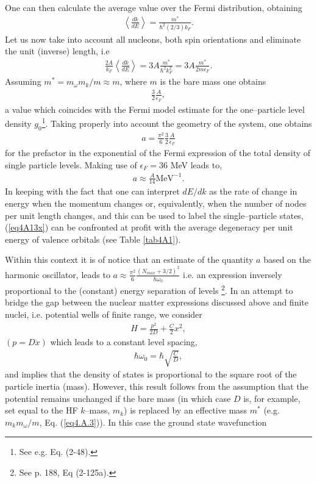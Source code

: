 \begin{subappendices}
One can then calculate the average value over the Fermi distribution, obtaining
\begin{align}
\left\langle\frac{dk}{dE}\right\rangle=\frac{m^*}{\hbar^2(2/3)k_F}.
\end{align}
 Let us now take into account all nucleons, both spin orientations and eliminate the unit (inverse) length, i.e
\begin{align}
\frac{2A}{k_F}\left\langle\frac{dk}{dE}\right\rangle=3A\frac{m^*}{\hbar^2k_F^2}=3A\frac{m^*}{2m\epsilon_F}.
\end{align}
Assuming $m^*=m_\omega m_k/m\approx m$, where $m$ is the bare mass one obtains
\begin{align}
\frac{3}{2}\frac{A}{\epsilon_F},
\end{align}
a value which coincides with the Fermi model estimate for the one--particle level density $g_0$\footnote{See e.g. \cite{Bohr:69} Eq. (2-48).}. Taking properly into account the geometry of the system, one obtains
\begin{align}\label{eq4A13}
a=\frac{\pi^2}{6}\frac{3}{2}\frac{A}{\epsilon_F}
\end{align}
for the prefactor in the exponential of the Fermi expression of the total density of single particle levels. Making use of $\epsilon_F=36$ MeV leads to,
\begin{align}\label{eq4A13x}
a\approx\frac{A}{14}\text{MeV}^{-1}.
\end{align}
In keeping with the fact that one can interpret $dE/dk$ as the rate of change in energy when the momentum changes or, equivalently, when the number of nodes per unit length changes, and this can be used to label the single--particle states, (\ref{eq4A13x}) can be confronted at profit with the average degeneracy per unit energy of valence orbitals (see Table \ref{tab4A1}). 



Within this context it is of notice that an estimate of the quantity $a$ based on the harmonic oscillator, leads to $a\approx\frac{\pi^2}{6}\frac{(N_{max}+3/2)^2}{\hbar\omega_0}$ i.e. an expression inversely proportional to the (constant) energy separation of levels \footnote{See \cite{Bohr:69} p. 188, Eq (2-125a).}. In an attempt to bridge the gap between the nuclear matter expressions discussed above and finite nuclei, i.e. potential wells of finite range, we consider
\begin{align}\label{eq4A14}
H=\frac{p^2}{2D}+\frac{C}{2}x^2,
\end{align}
$(p=D\dot x)$ which leads to a constant level spacing,
\begin{align}
\hbar\omega_0=\hbar\sqrt{\frac{C}{D}},
\end{align}
 and implies that the density of states is proportional to the square root of the particle inertia (mass). However, this result follows from the assumption that the potential remains unchanged if the bare mass (in which case $D$ is, for example, set equal to the HF $k$--mass, $m_k$) is replaced by an effective mass $m^*$ (e.g. $m_km_\omega/m$, Eq. (\ref{eq4.A.3})). In this case the ground state wavefunction
 

\end{subappendices}
